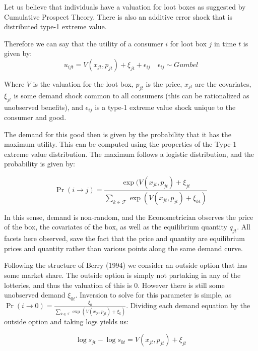 \documentclass[12pt]{paper}
\begin{document}
Let us believe that individuals have a valuation for loot boxes as
suggested by Cumulative Prospect Theory. There is also an additive
error shock that is distributed type-1 extreme value.

Therefore we can say that the utility of a consumer $i$ for loot box
$j$ in time $t$ is given by:
\begin{equation*}
  u_{ijt} = V( x_{jt}, p_{jt} ) + \xi_{jt} + \epsilon_{ij} \quad \epsilon_{ij} \sim Gumbel
\end{equation*}

Where $V$ is the valuation for the loot box, $p_{jt}$ is the price,
$x_{jt}$ are the covariates, $\xi_{jt}$ is some demand shock common to
all consumers (this can be rationalized as unobserved benefits), and
$\epsilon_{ij}$ is a type-1 extreme value shock unique to the consumer and
good.

The demand for this good then is given by the probability that it has
the maximum utility. This can be computed using the properties of the
Type-1 extreme value distribution. The maximum follows a logistic
distribution, and the probability is given by:

\begin{equation*}
  \Pr( i \rightarrow j ) = \frac{\exp( V(x_{jt},p_{jt}) + \xi_{jt}}{ \sum_{k \in \mathcal{F}}
    \exp(V(x_{jt},p_{jt}) + \xi_{kt})}
\end{equation*}

In this sense, demand is non-random, and the Econometrician observes
the price of the box, the covariates of the box, as well as the
equilibrium quantity $q_{jt}$. All facets here observed, save the fact
that the price and quantity are equilibrium prices and quantity rather
than various points along the same demand curve.

Following the structure of Berry (1994) we consider an outside option
that has some market share. The outside option is simply not partaking
in any of the lotteries, and thus the valuation of this is $0$.
However there is still some unobserved demand $\xi_{0t}$. Inversion to
solve for this parameter is simple, as
$\Pr( i \rightarrow 0) = \frac{\xi_0}{ \sum_{k \in \mathcal{F}} \exp(V(x_{jt},p_{jt}) +
  \xi_k)}$.  Dividing each demand equation by the outside option and
taking logs yields us:

\begin{equation*}
  \log s_{jt} - \log s_{0t} = V(x_{jt}, p_{jt}) + \xi_{jt}
\end{equation*}
\end{document}
